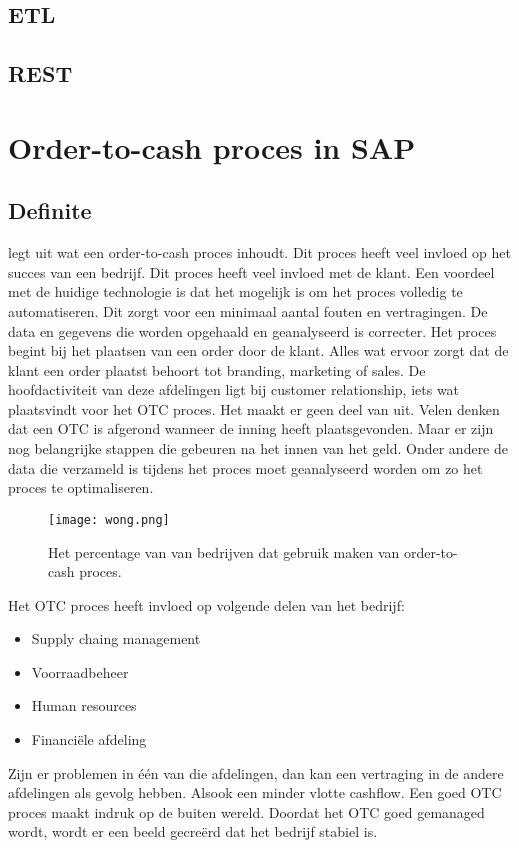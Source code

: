 \subsection{ETL}
\subsection{REST}
\section{Order-to-cash proces in SAP}
\subsection{Definite}
\textcite{Wong2018} legt uit wat een order-to-cash proces inhoudt. Dit proces heeft veel invloed op het succes van een bedrijf. Dit proces heeft veel invloed met de klant. Een voordeel met de huidige technologie is dat het mogelijk is om het proces volledig te automatiseren. Dit zorgt voor een minimaal aantal fouten en vertragingen. De data en gegevens die worden opgehaald en geanalyseerd is correcter. 
Het proces begint bij het plaatsen van een order door de klant. Alles wat ervoor zorgt dat de klant een order plaatst behoort tot branding, marketing of sales. De hoofdactiviteit van deze afdelingen ligt bij customer relationship, iets wat plaatsvindt voor het OTC proces. Het maakt er geen deel van uit. 
Velen denken dat een OTC is afgerond wanneer de inning heeft plaatsgevonden. Maar er zijn nog belangrijke stappen die gebeuren na het innen van het geld. Onder andere de data die verzameld is tijdens het proces moet geanalyseerd worden om zo het proces te optimaliseren. 
\begin{figure}[h]
	\texttt{[image: wong.png]}
	\caption{Het percentage van van bedrijven dat gebruik maken van order-to-cash proces. \textcite{Wong2018}}
	\centering
\end{figure}
Het OTC proces heeft invloed op volgende delen van het bedrijf:
\begin{itemize}
	\item Supply chaing management
	\item Voorraadbeheer
	\item Human resources
	\item Financiële afdeling
\end{itemize}
Zijn er problemen in één van die afdelingen, dan kan een vertraging in de andere afdelingen als gevolg hebben. Alsook een minder vlotte cashflow. 
Een goed OTC proces maakt indruk op de buiten wereld. Doordat het OTC goed gemanaged wordt, wordt er een beeld gecreërd dat het bedrijf stabiel is. 
